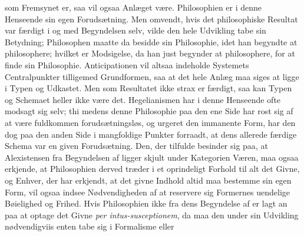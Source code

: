 \documentclass[12pt]{book}
\newcommand{\opage}[1]{\marginnote{\footnotesize\textit{[#1]}}}
\begin{document}
som Fremsynet er, saa vil ogsaa Anlæget være. Philosophien er i denne Henseende sin egen
Forudsætning. Men omvendt, hvis det philosophiske Resultat var færdigt i og med Begyndelsen
selv, vilde den hele Udvikling tabe sin Betydning; Philosophen maatte da besidde sin
Philosophie, idet han begyndte at philosophere; hvilket er Modsigelse, da han just begynder at
philosophere, for at finde sin Philosophie. Anticipationen vil altsaa indeholde Systemets
Centralpunkter tilligemed Grundformen, saa at det hele Anlæg maa siges at ligge i Typen og
Udkastet. Men som Resultatet ikke strax er færdigt, saa kan Typen og Schemaet heller ikke være
det. Hegelianismen har i denne Henseende ofte modsagt sig selv; thi medens denne Philosophie
paa den ene Side har rost sig af at være fuldkommen forudsætningsløs, og urgeret den immanente
Form, har den dog paa den anden Side i mangfoldige Punkter forraadt, at dens allerede færdige
Schema var en given Forudsætning. Den, der tilfulde besinder sig paa, at Alexistensen fra
Begyndelsen af ligger skjult under Kategorien Væren, maa ogsaa erkjende, at Philosophien derved
træder i et oprindeligt Forhold til alt det Givne, og Enhver, der har erkjendt, at det givne
Indhold altid maa bestemme sin egen Form, vil ogsaa indsee Nødvendigheden af at reservere sig
Formernes uendelige Bøielighed og Frihed. Hvis Philosophien ikke fra dens Begyndelse af er lagt
an paa at optage det Givne \textit{per intus-susceptionem}, da maa den under sin Udvikling
nødvendigviis enten tabe sig i Formalisme eller
\opage{106} %
\end{document}

